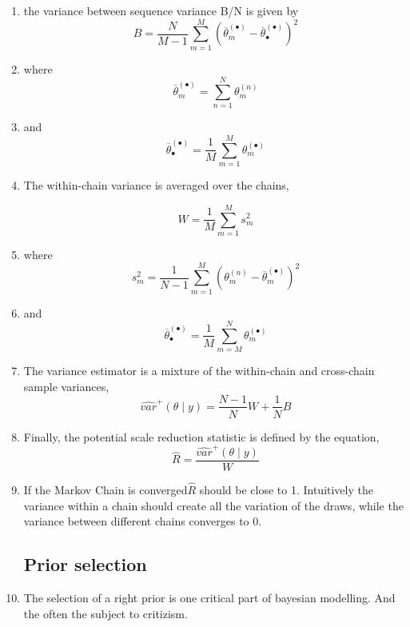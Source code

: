 \begin{enumerate}


\item the variance between sequence variance B/N is given by
$$B=\frac{N}{M-1} \sum_{m=1}^{M} (\overline{\theta}_m^{(\bullet)}-\overline{\theta}_{\bullet}^{(\bullet)} )^2 $$

\item where 
$$\overline{\theta}_m^{(\bullet)}=  \sum_{n=1}^{N} \theta_m^{(n)}$$

\item and
$$\overline{\theta}_{\bullet}^{(\bullet)}=\frac{1}{M} \sum_{m=1}^{M}  \theta_m^{(\bullet)}$$


\item The within-chain variance is averaged over the chains,

$$W=\frac{1}{M} \sum_{m=1}^{M} s_m^2$$

\item where 
$$s_m^2=\frac{1}{N-1} \sum_{m=1}^{M} (\theta_m^{(n)}-\overline{\theta}_{m}^{(\bullet)} )^2$$

\item and
$$\overline{\theta}_{\bullet}^{(\bullet)}=\frac{1}{M} \sum_{m=M}^{N}  \theta_m^{(\bullet)}$$


\item The variance estimator is a mixture of the within-chain and cross-chain sample variances,
$$\widehat{var}^+ (\theta \mid y)=\frac{N-1}{N}W+\frac{1}{N}B$$


\item Finally, the potential scale reduction statistic is defined by the equation,
$$\widehat{R}=\frac{\widehat{var}^+ (\theta \mid y)}{W}$$

\item If the Markov Chain is converged$ \widehat{R}$ should be close to 1. Intuitively the variance within a chain should create all the variation of the draws, while the variance between different chains converges to 0.



\subsection{Prior selection}
\item The selection of a right prior is one critical part of bayesian modelling. And the often the subject to critizism.


\end{enumerate}
